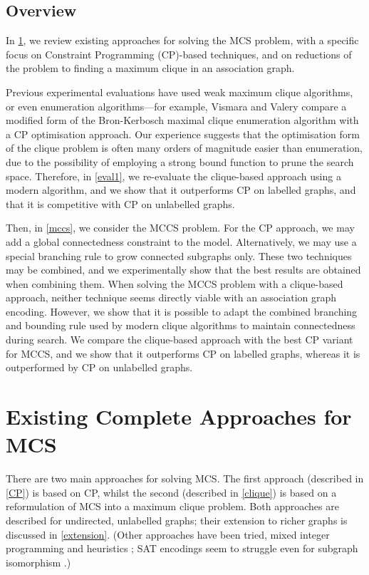 \documentclass{llncs}
\begin{document}
\subsection{Overview}

In \cref{existing}, we review existing approaches for solving the MCS problem, with a specific focus
on Constraint Programming (CP)-based techniques, and on reductions of the problem to finding a
maximum clique in an association graph.

Previous experimental evaluations have used weak maximum clique algorithms, or even enumeration
algorithms---for example, Vismara and Valery \cite{DBLP:conf/mco/VismaraV08} compare a modified form
of the Bron-Kerbosch maximal clique enumeration algorithm \cite{Bron:1973:AFC:362342.362367} with a
CP optimisation approach. Our experience suggests that the optimisation form of the clique problem
is often many orders of magnitude easier than enumeration, due to the possibility of employing a
strong bound function to prune the search space.  Therefore, in \cref{eval1}, we  re-evaluate the
clique-based approach using a modern algorithm, and we show that it outperforms CP on labelled
graphs, and that it is competitive with CP on unlabelled graphs.

Then, in \cref{mccs}, we consider the MCCS problem. For the CP approach, we may add a global
connectedness constraint to the model. Alternatively, we may use a special branching rule
\cite{DBLP:conf/mco/VismaraV08} to grow connected subgraphs only. These two techniques may
be combined, and we experimentally show that the best results are obtained when combining them.
When solving the MCCS problem with a clique-based approach, neither technique seems directly viable
with an association graph encoding.  However, we show that it is possible to adapt the combined
branching and bounding rule used by modern clique algorithms to maintain connectedness during
search.  We compare the clique-based approach with the best CP variant for MCCS, and we show
that it outperforms CP on labelled graphs, whereas it is outperformed by CP on unlabelled graphs.

\section{Existing Complete Approaches for MCS}\label{existing}

There are two main approaches for solving MCS. The first approach (described in \cref{CP}) is based
on CP, whilst the second (described in \cref{clique}) is based on a reformulation of MCS into a
maximum clique problem. Both approaches are described for undirected, unlabelled graphs; their
extension to richer graphs is discussed in \cref{extension}.  (Other approaches have been tried,
mixed integer programming \cite{DBLP:journals/anor/PivaS12} and heuristics
\cite{DBLP:journals/jcisd/EnglertK15}; SAT encodings seem to struggle even for subgraph isomorphism
\cite{UpcomingIJCAIPaper}.)
\end{document}
